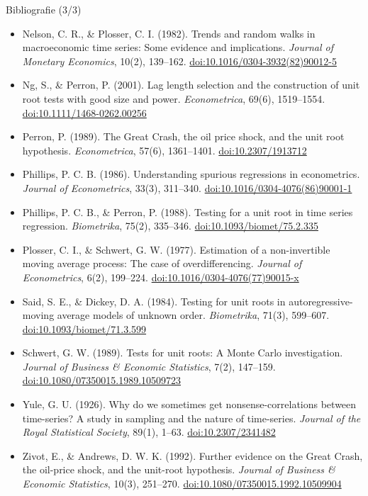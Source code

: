 \begin{frame}{Bibliografie (3/3)}
\itemsize{\scriptsize}
\begin{itemize}
    \item Nelson, C. R., \& Plosser, C. I. (1982). Trends and random walks in macroeconomic time series: Some evidence and implications. \textit{Journal of Monetary Economics}, 10(2), 139--162. \href{https://doi.org/10.1016/0304-3932(82)90012-5}{doi:10.1016/0304-3932(82)90012-5}
    \item Ng, S., \& Perron, P. (2001). Lag length selection and the construction of unit root tests with good size and power. \textit{Econometrica}, 69(6), 1519--1554. \href{https://doi.org/10.1111/1468-0262.00256}{doi:10.1111/1468-0262.00256}
    \item Perron, P. (1989). The Great Crash, the oil price shock, and the unit root hypothesis. \textit{Econometrica}, 57(6), 1361--1401. \href{https://doi.org/10.2307/1913712}{doi:10.2307/1913712}
    \item Phillips, P. C. B. (1986). Understanding spurious regressions in econometrics. \textit{Journal of Econometrics}, 33(3), 311--340. \href{https://doi.org/10.1016/0304-4076(86)90001-1}{doi:10.1016/0304-4076(86)90001-1}
    \item Phillips, P. C. B., \& Perron, P. (1988). Testing for a unit root in time series regression. \textit{Biometrika}, 75(2), 335--346. \href{https://doi.org/10.1093/biomet/75.2.335}{doi:10.1093/biomet/75.2.335}
    \item Plosser, C. I., \& Schwert, G. W. (1977). Estimation of a non-invertible moving average process: The case of overdifferencing. \textit{Journal of Econometrics}, 6(2), 199--224. \href{https://doi.org/10.1016/0304-4076(77)90015-x}{doi:10.1016/0304-4076(77)90015-x}
    \item Said, S. E., \& Dickey, D. A. (1984). Testing for unit roots in autoregressive-moving average models of unknown order. \textit{Biometrika}, 71(3), 599--607. \href{https://doi.org/10.1093/biomet/71.3.599}{doi:10.1093/biomet/71.3.599}
    \item Schwert, G. W. (1989). Tests for unit roots: A Monte Carlo investigation. \textit{Journal of Business \& Economic Statistics}, 7(2), 147--159. \href{https://doi.org/10.1080/07350015.1989.10509723}{doi:10.1080/07350015.1989.10509723}
    \item Yule, G. U. (1926). Why do we sometimes get nonsense-correlations between time-series? A study in sampling and the nature of time-series. \textit{Journal of the Royal Statistical Society}, 89(1), 1--63. \href{https://doi.org/10.2307/2341482}{doi:10.2307/2341482}
    \item Zivot, E., \& Andrews, D. W. K. (1992). Further evidence on the Great Crash, the oil-price shock, and the unit-root hypothesis. \textit{Journal of Business \& Economic Statistics}, 10(3), 251--270. \href{https://doi.org/10.1080/07350015.1992.10509904}{doi:10.1080/07350015.1992.10509904}
\end{itemize}
\end{frame}



